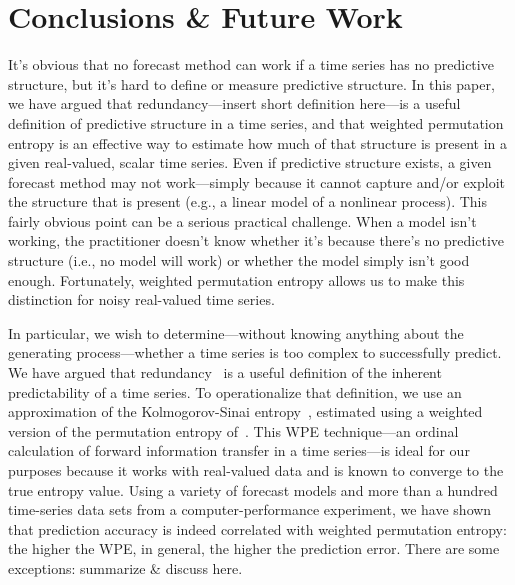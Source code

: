 \section{ Conclusions \& Future Work }\label{sec:conc}

It's obvious that no forecast method can work if a time series has no
predictive structure, but it's hard to define or measure predictive
structure.  In this paper, we have argued that redundancy---insert
short definition here---is a useful definition of predictive structure
in a time series, and that weighted permutation entropy is an
effective way to estimate how much of that structure is present in a
given real-valued, scalar time series.  Even if predictive structure
exists, a given forecast method may not work---simply because it
cannot capture and/or exploit the structure that is present (e.g., a
linear model of a nonlinear process).  This fairly obvious point can
be a serious practical challenge.  When a model isn't working, the
practitioner doesn't know whether it's because there's no predictive
structure (i.e., no model will work) or whether the model simply isn't
good enough.  Fortunately, weighted permutation entropy allows us to
make this distinction for noisy real-valued time series.

In particular, we wish to determine---without knowing anything about
the generating process---whether a time series is too complex to
successfully predict.  We have argued that
redundancy~\cite{crutchfield2003} is a useful definition of the
inherent predictability of a time series.  To operationalize that
definition, we use an approximation of the Kolmogorov-Sinai
entropy~\cite{lind95}, estimated using a weighted version of the
permutation entropy of~\cite{bandt2002per}.  This WPE technique---an
ordinal calculation of forward information transfer in a time
series---is ideal for our purposes because it works with real-valued
data and is known to converge to the true entropy value.  Using a
variety of forecast models and more than a hundred time-series data
sets from a computer-performance experiment, we have shown that
prediction accuracy is indeed correlated with weighted permutation
entropy: the higher the WPE, in general, the higher the prediction
error.  There are some exceptions: summarize \& discuss here.


